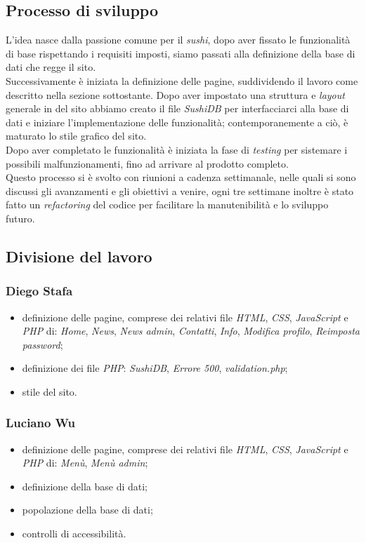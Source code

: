 \documentclass{template}
\begin{document}
	\subsection{Processo di sviluppo}
    L'idea nasce dalla passione comune per il \textit{sushi}, dopo aver fissato le funzionalità di base rispettando i requisiti imposti, siamo passati alla definizione della base di dati che regge il sito. \\
    Successivamente è iniziata la definizione delle pagine, suddividendo il lavoro come descritto nella sezione sottostante. Dopo aver impostato una struttura e \textit{layout} generale in del sito abbiamo creato il file \textit{SushiDB} per interfacciarci alla base di dati e iniziare l'implementazione delle funzionalità; contemporanemente a ciò, è maturato lo stile grafico del sito. \\
    Dopo aver completato le funzionalità è iniziata la fase di \textit{testing} per sistemare i possibili malfunzionamenti, fino ad arrivare al prodotto completo. \\
    Questo processo si è svolto con riunioni a cadenza settimanale, nelle quali si sono discussi gli avanzamenti e gli obiettivi a venire, ogni tre settimane inoltre è stato fatto un \textit{refactoring} del codice per facilitare la manutenibilità e lo sviluppo futuro. 
	
	\subsection{Divisione del lavoro}

	\subsubsection{Diego Stafa}
	\begin{itemize}
		\item definizione delle pagine, comprese dei relativi file \textit{HTML}, \textit{CSS}, \textit{JavaScript} e \textit{PHP} di: \textit{Home}, \textit{News}, \textit{News admin}, \textit{Contatti}, \textit{Info}, \textit{Modifica profilo}, \textit{Reimposta password};
		\item definizione dei file \textit{PHP}: \textit{SushiDB}, \textit{Errore 500}, \textit{validation.php};
		\item stile del sito.
	\end{itemize}

	\subsubsection{Luciano Wu}
	\begin{itemize}
		\item definizione delle pagine, comprese dei relativi file \textit{HTML}, \textit{CSS}, \textit{JavaScript} e \textit{PHP} di: \textit{Menù}, \textit{Menù admin};
        \item definizione della base di dati;
        \item popolazione della base di dati;
		\item controlli di accessibilità.
	\end{itemize}
\end{document}
